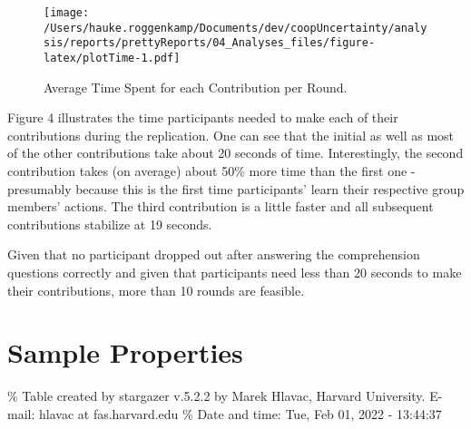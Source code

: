 \documentclass[11pt,]{article}
\begin{document}
\begin{figure}
\centering
\texttt{[image: /Users/hauke.roggenkamp/Documents/dev/coopUncertainty/analysis/reports/prettyReports/04\_Analyses\_files/figure-latex/plotTime-1.pdf]}
\caption{Average Time Spent for each Contribution per Round.}
\end{figure}

Figure 4 illustrates the time participants needed to make each of their
contributions during the replication. One can see that the initial as
well as most of the other contributions take about 20 seconds of time.
Interestingly, the second contribution takes (on average) about 50\%
more time than the first one - presumably because this is the first time
participants' learn their respective group members' actions. The third
contribution is a little faster and all subsequent contributions
stabilize at 19 seconds.

Given that no participant dropped out after answering the comprehension
questions correctly and given that participants need less than 20
seconds to make their contributions, more than 10 rounds are feasible.

\hypertarget{sample-properties}{%
\section{Sample Properties}\label{sample-properties}}

\% Table created by stargazer v.5.2.2 by Marek Hlavac, Harvard
University. E-mail: hlavac at fas.harvard.edu \% Date and time: Tue, Feb
01, 2022 - 13:44:37
\end{document}
